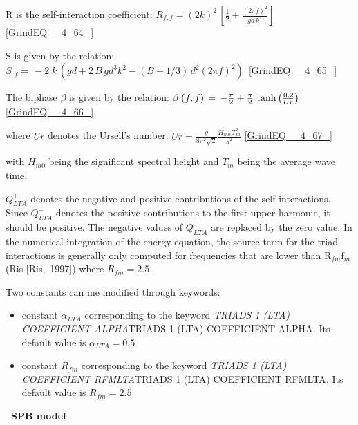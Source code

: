 R is the self-interaction coefficient: $R_{f,f} =\left(2k\right)^{2} \, \left[\frac{1}{2} +\frac{\left(2\pi f\right)^{2} }{gd\, k^{2} } \right]$ \eqref{GrindEQ__4_64_}

S is given by the relation: $S\; _{f} =\, -2\; k\, \left(gd+2\, B\, gd^{3} k_{}^{2} -(B+1/3)\, d^{2} \left(2\pi f\right)_{}^{2} \right)\, $ \eqref{GrindEQ__4_65_}

The biphase $\beta $ is given by the relation: $\beta {\kern 1pt} \left(f,f\right)\, =\, -\frac{\pi }{2} +\frac{\pi }{2} \, \tanh \left(\frac{0.2}{Ur} \right)$ \eqref{GrindEQ__4_66_}

where $Ur$ denotes the Ursell's number: $Ur=\frac{g}{8\pi ^{2} \sqrt{2} } \frac{H_{m0} \, T_{m}^{2} }{d^{2} } $ \eqref{GrindEQ__4_67_}

 with $H_{m0} $ being the significant spectral height and $T_{m} $ being the average wave time.

 $Q_{LTA}^{\pm } $ denotes the negative and positive contributions of the self-interactions. Since $Q_{LTA}^{+} $ denotes the positive contributions to the first upper harmonic, it should be positive. The negative values of $Q_{LTA}^{+} $ are replaced by the zero value. In the numerical integration of the energy equation, the source term for the triad interactions is generally only computed for frequencies that are lower than R${}_{fm}$f${}_{m}$ (Ris [Ris,~1997]) where $R_{fm} =2.5$.

 Two constants can me modified through keywords:

\begin{itemize}
\item  constant $\alpha _{LTA} $ corresponding to the keyword \textit{TRIADS 1 (LTA) COEFFICIENT ALPHA}TRIADS 1 (LTA) COEFFICIENT ALPHA\textit{.} Its default value is $\alpha _{LTA} =0.5$

\item  constant $R_{fm} $ corresponding to the keyword \textit{TRIADS 1 (LTA) COEFFICIENT RFMLTA}TRIADS 1 (LTA) COEFFICIENT RFMLTA\textit{.} Its default value is $R_{fm} =2.5$
\end{itemize}


{\bf  ~SPB model}

